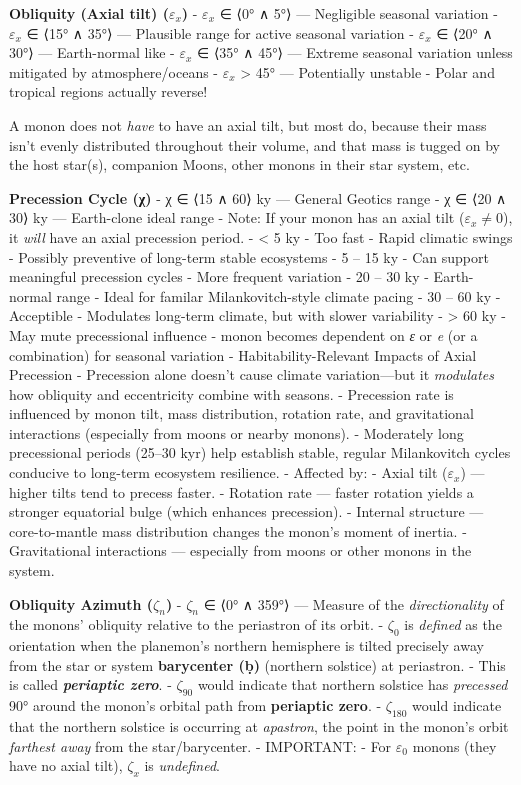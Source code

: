 \documentclass[
  letterpaper,
]{book}
\begin{document}
\textbf{Obliquity (Axial tilt) (\(\varepsilon_x\))} - \(\varepsilon_x\)
∈ ⟨0° ∧ 5°⟩ --- Negligible seasonal variation - \(\varepsilon_x\) ∈ ⟨15°
∧ 35°⟩ --- Plausible range for active seasonal variation -
\(\varepsilon_x\) ∈ ⟨20° ∧ 30°⟩ --- Earth-normal like -
\(\varepsilon_x\) ∈ ⟨35° ∧ 45°⟩ --- Extreme seasonal variation unless
mitigated by atmosphere/oceans - \(\varepsilon_x\) \textgreater{} 45°
--- Potentially unstable - Polar and tropical regions actually reverse!

A monon does not \emph{have} to have an axial tilt, but most do, because
their mass isn't evenly distributed throughout their volume, and that
mass is tugged on by the host star(s), companion Moons, other monons in
their star system, etc.

\textbf{Precession Cycle (χ)} - χ ∈ ⟨15 ∧ 60⟩ ky --- General Geotics
range - χ ∈ ⟨20 ∧ 30⟩ ky --- Earth-clone ideal range - Note: If your
monon has an axial tilt (\(\varepsilon_x ≠ 0\)), it \emph{will} have an
axial precession period. - \textless{} 5 ky - Too fast - Rapid climatic
swings - Possibly preventive of long-term stable ecosystems - 5 -- 15 ky
- Can support meaningful precession cycles - More frequent variation -
20 -- 30 ky - Earth-normal range - Ideal for familar Milankovitch-style
climate pacing - 30 -- 60 ky - Acceptible - Modulates long-term climate,
but with slower variability - \textgreater{} 60 ky - May mute
precessional influence - monon becomes dependent on \emph{ε} or \emph{e}
(or a combination) for seasonal variation - Habitability-Relevant
Impacts of Axial Precession - Precession alone doesn't cause climate
variation---but it \emph{modulates} how obliquity and eccentricity
combine with seasons. - Precession rate is influenced by monon tilt,
mass distribution, rotation rate, and gravitational interactions
(especially from moons or nearby monons). - Moderately long precessional
periods (25--30 kyr) help establish stable, regular Milankovitch cycles
conducive to long-term ecosystem resilience. - Affected by: - Axial tilt
(\(\varepsilon_x\)) --- higher tilts tend to precess faster. - Rotation
rate --- faster rotation yields a stronger equatorial bulge (which
enhances precession). - Internal structure --- core-to-mantle mass
distribution changes the monon's moment of inertia. - Gravitational
interactions --- especially from moons or other monons in the system.

\textbf{Obliquity Azimuth (\(\zeta_{n}\))} - \(\zeta_{n}\) ∈ ⟨0° ∧ 359°⟩
--- Measure of the \emph{directionality} of the monons' obliquity
relative to the periastron of its orbit. - \(\zeta_0\) is \emph{defined}
as the orientation when the planemon's northern hemisphere is tilted
precisely away from the star or system \textbf{barycenter (ḅ)} (northern
solstice) at periastron. - This is called \textbf{\emph{periaptic
zero}}. - \(\zeta_{90}\) would indicate that northern solstice has
\emph{precessed} 90° around the monon's orbital path from
\textbf{periaptic zero}. - \(\zeta_{180}\) would indicate that the
northern solstice is occurring at \emph{apastron}, the point in the
monon's orbit \emph{farthest away} from the star/barycenter. -
IMPORTANT: - For \(\varepsilon_0\) monons (they have no axial tilt),
\(\zeta_x\) is \emph{undefined}.
\end{document}
